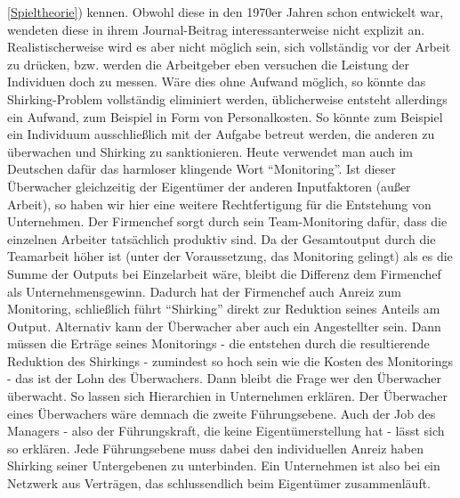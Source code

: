 \ref{Spieltheorie}) kennen. Obwohl diese in den 1970er Jahren schon entwickelt war, wendeten \textcite{Alchian1972} diese in ihrem Journal-Beitrag interessanterweise nicht explizit an. Realistischerweise wird es aber nicht möglich sein, sich vollständig vor der Arbeit zu drücken, bzw. werden die Arbeitgeber eben versuchen die Leistung der Individuen doch zu messen. Wäre dies ohne Aufwand möglich, so könnte das Shirking-Problem vollständig eliminiert werden, üblicherweise entsteht allerdings ein Aufwand, zum Beispiel in Form von Personalkosten. So könnte zum Beispiel ein Individuum ausschließlich mit der Aufgabe betreut werden, die anderen zu überwachen und Shirking zu sanktionieren. Heute verwendet man auch im Deutschen dafür das harmloser klingende Wort "`Monitoring"'. Ist dieser Überwacher gleichzeitig der Eigentümer der anderen Inputfaktoren (außer Arbeit), so haben wir hier eine weitere Rechtfertigung für die Entstehung von Unternehmen. Der Firmenchef sorgt durch sein Team-Monitoring dafür, dass die einzelnen Arbeiter tatsächlich produktiv sind. Da der Gesamtoutput durch die Teamarbeit höher ist (unter der Voraussetzung, das Monitoring gelingt) als es die Summe der Outputs bei Einzelarbeit wäre, bleibt die Differenz dem Firmenchef als Unternehmensgewinn. Dadurch hat der Firmenchef auch Anreiz zum Monitoring, schließlich führt "`Shirking"' direkt zur Reduktion seines Anteils am Output. Alternativ kann der Überwacher aber auch ein Angestellter sein. Dann müssen die Erträge seines Monitorings - die entstehen durch die resultierende Reduktion des Shirkings - zumindest so hoch sein wie die Kosten des Monitorings - das ist der Lohn des Überwachers. Dann bleibt die Frage wer den Überwacher überwacht. So lassen sich Hierarchien in Unternehmen erklären. Der Überwacher eines Überwachers wäre demnach die zweite Führungsebene. Auch der Job des Managers - also der Führungskraft, die keine Eigentümerstellung hat - lässt sich so erklären. Jede Führungsebene muss dabei den individuellen Anreiz haben Shirking seiner Untergebenen zu unterbinden. Ein Unternehmen ist also bei \textcite{Alchian1972} ein Netzwerk aus Verträgen, das schlussendlich beim Eigentümer zusammenläuft.

